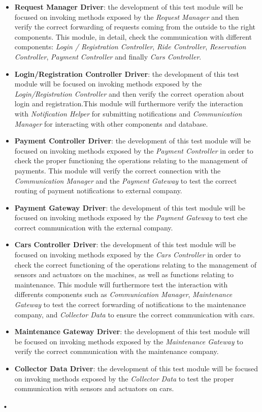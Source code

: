 \documentclass[10pt, a4paper,titlepage]{article}
\begin{document}
\begin{itemize}
\item \textbf{Request Manager Driver}: the development of this test module will be focused on invoking methods exposed by the \emph{Request Manager} and then verify the correct forwarding of requests coming from the outside to the right components. This module, in detail, check the communication with different components: \emph{Login / Registration Controller}, \emph{Ride Controller}, \emph{Reservation Controller}, \emph{Payment Controller} and finally \emph{Cars Controller}.
\item \textbf{Login/Registration Controller Driver}: the development of this test module will be focused on invoking methods exposed by the \emph{Login/Registration Controller} and then verify the correct operation about login and registration.This module will furthermore verify the interaction with \emph{Notification Helper} for submitting notifications and \emph{Communication Manager} for interacting with other components and database.
\item \textbf{Payment Controller Driver}: the development of this test module will be focused on invoking methods exposed by the \emph{Payment Controller} in order to check the proper functioning the operations relating to the management of payments. This module will verify the correct connection with the \emph{Communication Manager} and the \emph{Payment Gateway} to test the correct routing of payment notifications to external company.
\item \textbf{Payment Gateway Driver}: the development of this test module will be focused on invoking methods exposed by the \emph{Payment Gateway} to test che correct communication with the external company.
\item \textbf{Cars Controller Driver}: the development of this test module will be focused on invoking methods exposed by the \emph{Cars Controller} in order to check the correct functioning of the operations relating to the management of sensors and actuators on the machines, as well as functions relating to maintenance. This module will furthermore test the interaction with differents components such as \emph{Communication Manager}, \emph{Maintenance Gateway} to test the correct forwarding of notifications to the maintenance company, and \emph{Collector Data} to ensure the correct communication with cars.
\item \textbf{Maintenance Gateway Driver}: the development of this test module will be focused on invoking methods exposed by the \emph{Maintenance Gateway} to verify the correct communication with the maintenance company.
\item \textbf{Collector Data Driver}: the development of this test module will be focused on invoking methods exposed by the \emph{Collector Data} to test the proper communication with sensors and actuators on cars.
\end{itemize}•
\end{document}
